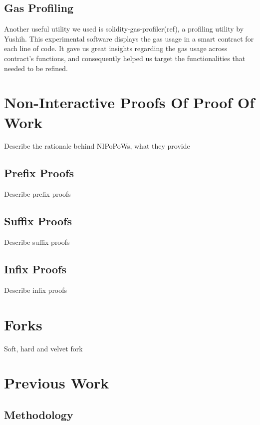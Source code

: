 
\subsection{Gas Profiling}

Another useful utility we used is solidity-gas-profiler(ref), a profiling
utility by Yushih. This experimental software displays the gas usage in a smart
contract for each line of code. It gave us great insights regarding the gas
usage across contract’s functions, and consequently helped us target the
functionalities that needed to be refined.


\section{Non-Interactive Proofs Of Proof Of Work}

Describe the rationale behind NIPoPoWs, what they provide

\subsection{Prefix Proofs}

Describe prefix proofs

\subsection{Suffix Proofs}

Describe suffix proofs

\subsection{Infix Proofs}

Describe infix proofs

\section{Forks}

Soft, hard and velvet fork

\section{Previous Work}

\subsection{Methodology}

